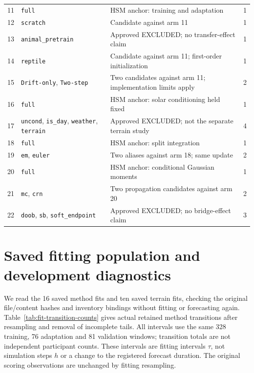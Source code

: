 {\begin{longtable}{p{.06\linewidth}p{.36\linewidth}p{.43\linewidth}r}
11 & \texttt{full} & HSM anchor: training and adaptation & 1\\
12 & \texttt{scratch} & Candidate against arm 11 & 1\\
13 & \texttt{animal\_pretrain} & Approved EXCLUDED; no transfer-effect claim & 1\\
14 & \texttt{reptile} & Candidate against arm 11; first-order initialization & 1\\
15 & \texttt{Drift-only}, \texttt{Two-step} & Two candidates against arm 11; implementation limits apply & 2\\
16 & \texttt{full} & HSM anchor: solar conditioning held fixed & 1\\
17 & \texttt{uncond}, \texttt{is\_day}, \texttt{weather}, \texttt{terrain} & Approved EXCLUDED; not the separate terrain study & 4\\
18 & \texttt{full} & HSM anchor: split integration & 1\\
19 & \texttt{em}, \texttt{euler} & Two aliases against arm 18; same update & 2\\
20 & \texttt{full} & HSM anchor: conditional Gaussian moments & 1\\
21 & \texttt{mc}, \texttt{crn} & Two propagation candidates against arm 20 & 2\\
22 & \texttt{doob}, \texttt{sb}, \texttt{soft\_endpoint} & Approved EXCLUDED; no bridge-effect claim & 3\\
\end{longtable}
}


\section{Saved fitting population and development diagnostics}
\label{sec:saved-fit-diagnostics}\hypertarget{sec:saved-fit-diagnostics}{}
We read the 16 saved method fits and ten saved terrain fits, checking the
original file/content hashes and inventory bindings without fitting or
forecasting again. Table~\ref{tab:fit-transition-counts} gives actual retained
method transitions after resampling and removal of incomplete tails.
All intervals use the same 328 training, 76 adaptation and 81 validation
windows; transition totals are not independent participant counts. These
intervals are fitting intervals \(\tau\), not simulation steps \(h\) or a
change to the registered forecast duration. The original scoring observations
are unchanged by fitting resampling.

